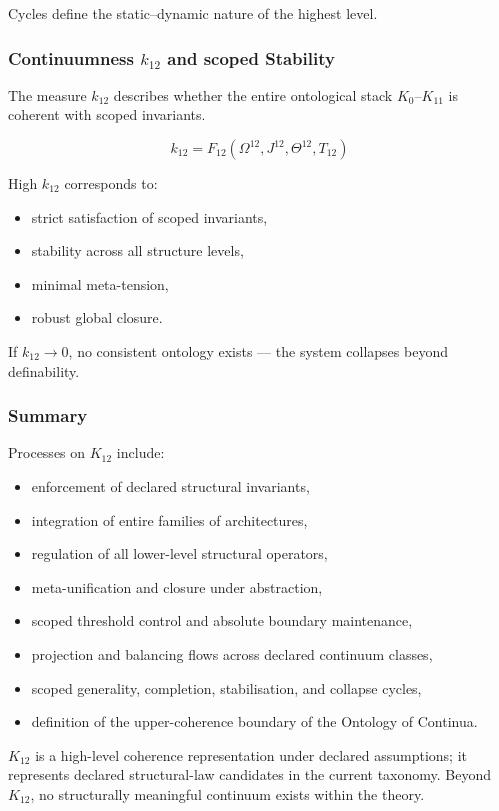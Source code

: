 Cycles define the static--dynamic nature of the highest level.

\subsubsection{Continuumness $k_{12}$ and scoped Stability}

The measure $k_{12}$ describes whether
the entire ontological stack $K_0$--$K_{11}$
is coherent with scoped invariants.

\[
k_{12} = F_{12}(\Omega^{12}, J^{12}, \Theta^{12}, T_{12})
\]

High $k_{12}$ corresponds to:
\begin{itemize}
    \item strict satisfaction of scoped invariants,
    \item stability across all structure levels,
    \item minimal meta-tension,
    \item robust global closure.
\end{itemize}

If $k_{12} \to 0$,
no consistent ontology exists --- the system collapses beyond definability.

\subsubsection{Summary}

Processes on $K_{12}$ include:
\begin{itemize}
    \item enforcement of declared structural invariants,
    \item integration of entire families of architectures,
    \item regulation of all lower-level structural operators,
    \item meta-unification and closure under abstraction,
    \item scoped threshold control and absolute boundary maintenance,
    \item projection and balancing flows across declared continuum classes,
    \item scoped generality, completion, stabilisation, and collapse cycles,
    \item definition of the upper-coherence boundary of the Ontology of Continua.
\end{itemize}

$K_{12}$ is a high-level coherence representation under declared assumptions; it represents declared structural-law candidates in the current taxonomy.
Beyond $K_{12}$, no structurally meaningful continuum exists within the theory.
